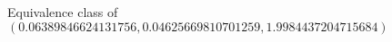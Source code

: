 \documentclass[preview]{standalone}
\begin{document}
\begin{center}
Equivalence class of $(0.06389846624131756, 0.04625669810701259, 1.9984437204715684)$
\end{center}
\end{document}
